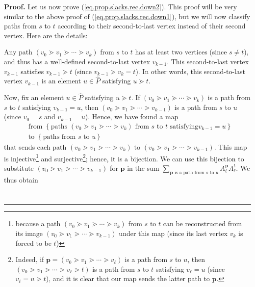 \documentclass[numbers=enddot,12pt,final,onecolumn,notitlepage]{scrartcl}%
\theoremstyle{definition}
\newenvironment{verlong}{}{}
\newcommand{\downslack}{A}
\newenvironment{proof}[1][Proof]{\noindent\textbf{#1.} }{\ \rule{0.5em}{0.5em}}
\let\sumnonlimits\sum
\renewcommand{\sum}{\sumnonlimits\limits}
\begin{document}
\begin{verlong}
\begin{proof}
Let us now prove (\ref{eq.prop.slacks.rec.down2}). This proof will be very
similar to the above proof of (\ref{eq.prop.slacks.rec.down1}), but we will
now classify paths from $s$ to $t$ according to their second-to-last vertex
instead of their second vertex. Here are the details:

Any path $\left(  v_{0}\gtrdot v_{1}\gtrdot\cdots\gtrdot v_{k}\right)  $ from
$s$ to $t$ has at least two vertices (since $s\neq t$), and thus has a
well-defined second-to-last vertex $v_{k-1}$. This second-to-last vertex
$v_{k-1}$ satisfies $v_{k-1}\gtrdot t$ (since $v_{k-1}\gtrdot v_{k}=t$). In
other words, this second-to-last vertex $v_{k-1}$ is an element $u\in
\widehat{P}$ satisfying $u\gtrdot t$.

Now, fix an element $u\in\widehat{P}$ satisfying $u\gtrdot t$. If $\left(
v_{0}\gtrdot v_{1}\gtrdot\cdots\gtrdot v_{k}\right)  $ is a path from $s$ to
$t$ satisfying $v_{k-1}=u$, then $\left(  v_{0}\gtrdot v_{1}\gtrdot
\cdots\gtrdot v_{k-1}\right)  $ is a path from $s$ to $u$ (since $v_{0}=s$ and
$v_{k-1}=u$). Hence, we have found a map
\begin{align*}
&  \text{from }\left\{  \text{paths }\left(  v_{0}\gtrdot v_{1}\gtrdot
\cdots\gtrdot v_{k}\right)  \text{ from }s\text{ to }t\text{ satisfying
}v_{k-1}=u\right\} \\
&  \text{to }\left\{  \text{paths from }s\text{ to }u\right\}
\end{align*}
that sends each path $\left(  v_{0}\gtrdot v_{1}\gtrdot\cdots\gtrdot
v_{k}\right)  $ to $\left(  v_{0}\gtrdot v_{1}\gtrdot\cdots\gtrdot
v_{k-1}\right)  $. This map is injective\footnote{because a path $\left(
v_{0}\gtrdot v_{1}\gtrdot\cdots\gtrdot v_{k}\right)  $ from $s$ to $t$ can be
reconstructed from its image $\left(  v_{0}\gtrdot v_{1}\gtrdot\cdots\gtrdot
v_{k-1}\right)  $ under this map (since its last vertex $v_{k}$ is forced to
be $t$)} and surjective\footnote{Indeed, if $\mathbf{p}=\left(  v_{0}\gtrdot
v_{1}\gtrdot\cdots\gtrdot v_{\ell}\right)  $ is a path from $s$ to $u$, then
$\left(  v_{0}\gtrdot v_{1}\gtrdot\cdots\gtrdot v_{\ell}\gtrdot t\right)  $ is
a path from $s$ to $t$ satisfying $v_{\ell}=u$ (since $v_{\ell}=u\gtrdot t$),
and it is clear that our map sends the latter path to $\mathbf{p}$.}; hence,
it is a bijection. We can use this bijection to substitute $\left(
v_{0}\gtrdot v_{1}\gtrdot\cdots\gtrdot v_{k-1}\right)  $ for $\mathbf{p}$ in
the sum $\sum_{\mathbf{p}\text{ is a path from }s\text{ to }u}\downslack_{\ell
}^{\mathbf{p}}\downslack_{\ell}^{t}$. We thus obtain
\begin{align}

\end{align}
\end{proof}
\end{verlong}
\end{document}
